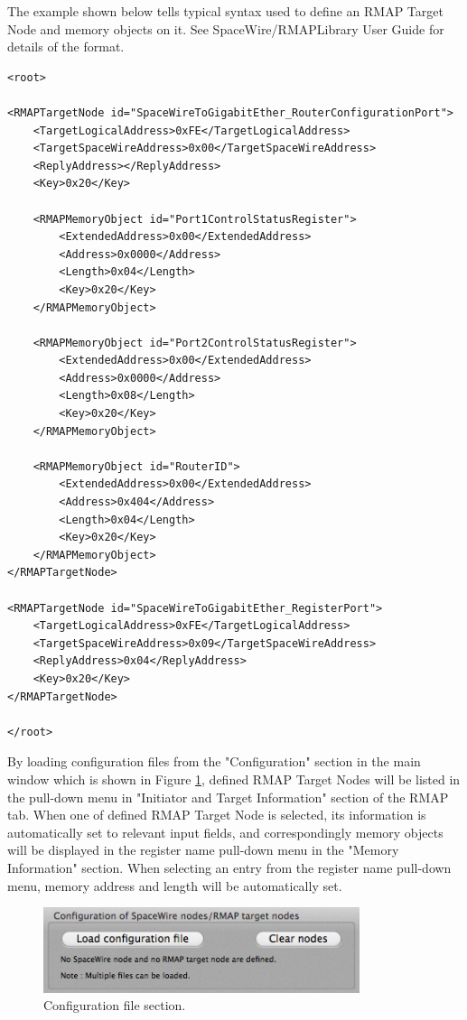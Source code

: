 \documentclass[a4paper,10pt]{article}
\begin{document}
The example shown below tells typical syntax used to define an RMAP Target Node and memory objects on it.  See SpaceWire/RMAPLibrary User Guide for details of the format.

\begin{lstlisting}[label=source:xml_configurationfile_example, caption=An example of an XML-like configuration file.]
<root>

<RMAPTargetNode id="SpaceWireToGigabitEther_RouterConfigurationPort">
	<TargetLogicalAddress>0xFE</TargetLogicalAddress>
	<TargetSpaceWireAddress>0x00</TargetSpaceWireAddress>
	<ReplyAddress></ReplyAddress>
	<Key>0x20</Key>

	<RMAPMemoryObject id="Port1ControlStatusRegister">
		<ExtendedAddress>0x00</ExtendedAddress>
		<Address>0x0000</Address>
		<Length>0x04</Length>
		<Key>0x20</Key>
	</RMAPMemoryObject>

	<RMAPMemoryObject id="Port2ControlStatusRegister">
		<ExtendedAddress>0x00</ExtendedAddress>
		<Address>0x0000</Address>
		<Length>0x08</Length>
		<Key>0x20</Key>
	</RMAPMemoryObject>

	<RMAPMemoryObject id="RouterID">
		<ExtendedAddress>0x00</ExtendedAddress>
		<Address>0x404</Address>
		<Length>0x04</Length>
		<Key>0x20</Key>
	</RMAPMemoryObject>
</RMAPTargetNode>

<RMAPTargetNode id="SpaceWireToGigabitEther_RegisterPort">
	<TargetLogicalAddress>0xFE</TargetLogicalAddress>
	<TargetSpaceWireAddress>0x09</TargetSpaceWireAddress>
	<ReplyAddress>0x04</ReplyAddress>
	<Key>0x20</Key>	
</RMAPTargetNode>

</root>
\end{lstlisting}

By loading configuration files from the "Configuration" section in the main window which is shown in Figure \ref{figure:section_ConfigurationFiles}, defined RMAP Target Nodes will be listed in the pull-down menu in "Initiator and Target Information" section of the RMAP tab. When one of defined RMAP Target Node is selected, its information is automatically set to relevant input fields, and correspondingly memory objects will be displayed in the register name pull-down menu in the "Memory Information" section. When selecting an entry from the register name pull-down menu, memory address and length will be automatically set.
\begin{figure}[htb]
\begin{center}
\includegraphics[height=2.5cm]{figures/SpaceWireRMAPGUI/Section_LoadConfigurationFile.png}
\vspace{-2mm}
\caption{Configuration file section.}
\label{figure:section_ConfigurationFiles}
\end{center}
\end{figure}
\end{document}
